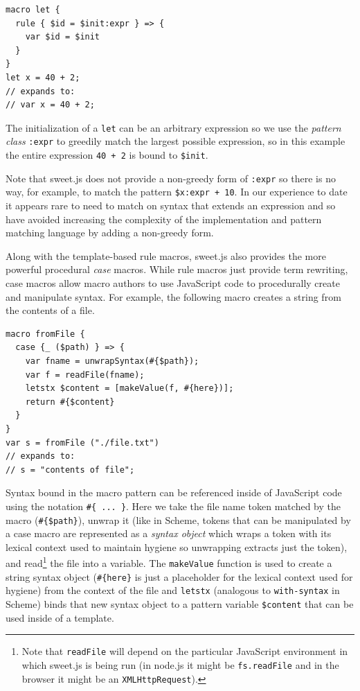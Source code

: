 \documentclass[9pt]{sigplanconf}
\begin{document}
\begin{lstlisting}
macro let {
  rule { $id = $init:expr } => {
    var $id = $init
  }
}
let x = 40 + 2;
// expands to:
// var x = 40 + 2;
\end{lstlisting}

The initialization of a \verb!let! can be an arbitrary expression so
we use the \emph{pattern class} \verb!:expr! to greedily match the
largest possible expression, so in this example the entire expression
\verb!40 + 2! is bound to \verb!$init!.

Note that sweet.js does not provide a non-greedy form of \verb!:expr!
so there is no way, for example, to match the pattern
\verb!$x:expr + 10!. In our experience to date it appears rare to need
to match on syntax that extends an expression and so have avoided
increasing the complexity of the implementation and pattern matching
language by adding a non-greedy form.

Along with the template-based rule macros, sweet.js also provides the
more powerful procedural \emph{case} macros. 
While rule macros just provide term rewriting, case macros allow macro authors to use JavaScript code to procedurally create and manipulate syntax. 
For example, the following macro creates a string from the contents of a file.
\begin{lstlisting}
macro fromFile {
  case {_ ($path) } => {
    var fname = unwrapSyntax(#{$path});
    var f = readFile(fname);
    letstx $content = [makeValue(f, #{here})];
    return #{$content}
  }
}
var s = fromFile ("./file.txt")
// expands to:
// s = "contents of file";
\end{lstlisting}
Syntax bound in the macro pattern can be referenced inside of
JavaScript code using the notation \verb!#{ ... }!. Here we take the
file name token matched by the macro (\verb!#{$path}!), unwrap it
(like in Scheme, tokens that can be manipulated by a case macro are
represented as a \emph{syntax object} which wraps a token with its
lexical context used to maintain hygiene so unwrapping extracts just
the token), and read\footnote{Note that \verb!readFile! will depend on
  the particular JavaScript environment in which sweet.js is being run
  (\eg in node.js it might be \verb!fs.readFile! and in the browser it
  might be an \verb!XMLHttpRequest!).} the file into a variable. The
\verb!makeValue! function is used to create a string syntax object
(\verb!#{here}! is just a placeholder for the lexical context used for
hygiene) from the context of the file and \verb!letstx! (analogous to
\verb!with-syntax! in Scheme) binds that new syntax object to a
pattern variable \verb!$content! that can be used inside of a
template.
\end{document}
